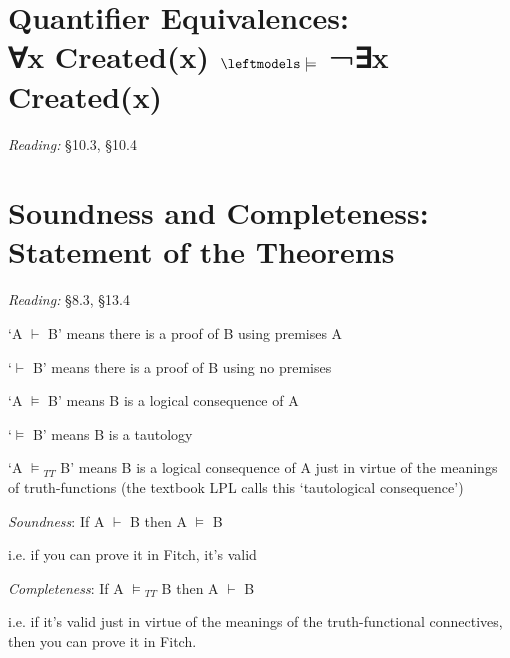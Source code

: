 \documentclass[12pt]{extarticle}
\begin{document}
\begin{multicols*}{3}
 
\section{Quantifier Equivalences: \\ ∀x Created(x) $\leftmodels\models$ ¬∃x Created(x)}
 
\emph{Reading:} §10.3, §10.4
 
 
 \columnbreak
\section{Soundness and Completeness: Statement of the Theorems}
 
\emph{Reading:} §8.3, §13.4
 
‘A $\vdash$ B’ means there is a proof of B using premises A
 
‘$\vdash$ B’ means there is a proof of B using no premises
 
‘A $\models$ B’ means B is a logical consequence of A
 
‘$\models$ B’ means B is a tautology
 
‘A $\models$$_{TT}$ B’ means B is a logical consequence of A just in virtue of the meanings of truth-functions (the textbook LPL calls this ‘tautological consequence’)
 
\emph{Soundness}: If A $\vdash$ B then A $\models$ B
 
\hspace{3mm} i.e. if you can prove it in Fitch, it’s valid
 
\emph{Completeness}: If A $\models$$_{TT}$ B then A $\vdash$ B
 
\hspace{3mm} i.e. if it’s valid just in virtue of the meanings of the truth-functional connectives, then you can prove it in Fitch.
 


 

\end{multicols*}
\end{document}

